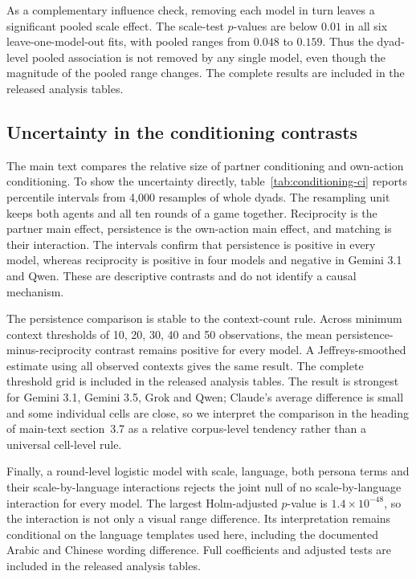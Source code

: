 \documentclass[11pt,a4paper]{article}
\begin{document}
As a complementary influence check, removing each model in turn leaves a significant pooled scale effect. The scale-test $p$-values are below $0.01$ in all six leave-one-model-out fits, with pooled ranges from $0.048$ to $0.159$. Thus the dyad-level pooled association is not removed by any single model, even though the magnitude of the pooled range changes. The complete results are included in the released analysis tables.

\subsection{Uncertainty in the conditioning contrasts}\label{appendix:conditioning_ci}

The main text compares the relative size of partner conditioning and own-action conditioning. To show the uncertainty directly, table~\ref{tab:conditioning-ci} reports percentile intervals from 4,000 resamples of whole dyads. The resampling unit keeps both agents and all ten rounds of a game together. Reciprocity is the partner main effect, persistence is the own-action main effect, and matching is their interaction. The intervals confirm that persistence is positive in every model, whereas reciprocity is positive in four models and negative in Gemini 3.1 and Qwen. These are descriptive contrasts and do not identify a causal mechanism.

The persistence comparison is stable to the context-count rule. Across minimum context thresholds of 10, 20, 30, 40 and 50 observations, the mean persistence-minus-reciprocity contrast remains positive for every model. A Jeffreys-smoothed estimate using all observed contexts gives the same result. The complete threshold grid is included in the released analysis tables. The result is strongest for Gemini 3.1, Gemini 3.5, Grok and Qwen; Claude's average difference is small and some individual cells are close, so we interpret the comparison in the heading of main-text section~3.7 as a relative corpus-level tendency rather than a universal cell-level rule.

Finally, a round-level logistic model with scale, language, both persona terms and their scale-by-language interactions rejects the joint null of no scale-by-language interaction for every model. The largest Holm-adjusted $p$-value is $1.4\times10^{-48}$, so the interaction is not only a visual range difference. Its interpretation remains conditional on the language templates used here, including the documented Arabic and Chinese wording difference. Full coefficients and adjusted tests are included in the released analysis tables.
\end{document}

